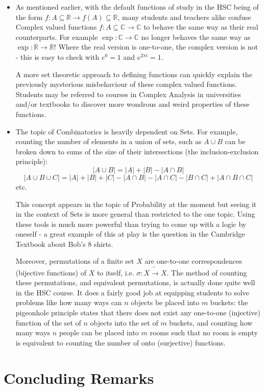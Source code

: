 \documentclass[11pt, a4paper, oneside]{article}
\begin{document}
\begin{itemize}
  \item As mentioned earlier, with the default functions of study in the HSC being of the form $f: A \subseteq \mathbb{R} \rightarrow f(A) \subseteq \mathbb{R}$, many students and teachers alike confuse Complex valued functions $f: A \subseteq \mathbb{C} \rightarrow \mathbb{C}$ to behave the same way as their real counterparts. For example $\exp: \mathbb{C} \rightarrow \mathbb{C}$ no longer behaves the same way as $\exp: \mathbb{R} \rightarrow \mathbb{R}$! Where the real version is one-to-one, the complex version is not - this is easy to check with $e^0 = 1$ and $e^{2\pi i} = 1$.

    A more set theoretic approach to defining functions can quickly explain the previously mysterious misbehaviour of these complex valued functions. Students may be referred to courses in Complex Analysis in universities and/or textbooks to discover more wondrous and weird properties of these functions.

  \item The topic of Combinatorics is heavily dependent on Sets. For example, counting the number of elements in a union of sets, such as $A \cup B$ can be broken down to sums of the size of their intersections (the inclusion-exclusion principle):
    \[ |A \cup B| = |A| + |B| - |A \cap B| \]
    \[ |A \cup B \cup C| = |A| + |B| + |C| - |A \cap B| - |A \cap C| - |B\cap C| + |A \cap B \cap C| \]
    etc.

    This concept appears in the topic of Probability at the moment but seeing it in the context of Sets is more general than restricted to the one topic. Using these tools is much more powerful than trying to come up with a logic by oneself - a great example of this at play is the question in the Cambridge Textbook about Bob's 8 shirts.

    Moreover, permutations of a finite set $X$ are one-to-one correspondences (bijective functions) of $X$ to itself, i.e. $\sigma: X \tilde{\rightarrow} X$. The method of counting these permutations, and equivalent permutations, is actually done quite well in the HSC course. It does a fairly good job at equipping students to solve problems like how many ways can $n$ objects be placed into $m$ buckets: the pigeonhole principle states that there does not exist any one-to-one (injective) function of the set of $n$ objects into the set of $m$ buckets, and counting how many ways $n$ people can be placed into $m$ rooms such that no room is empty is equivalent to counting the number of onto (surjective) functions.
\end{itemize}

\section{Concluding Remarks}
\end{document}
